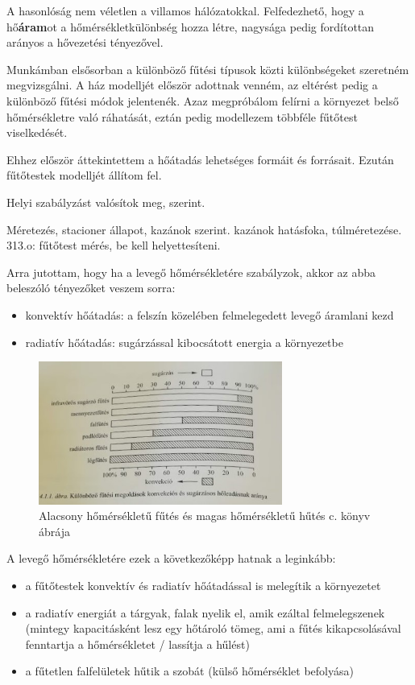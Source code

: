 A hasonlóság nem véletlen a villamos hálózatokkal. Felfedezhető, hogy a hő\textbf{áram}ot a hőmérsékletkülönbség hozza létre, nagysága pedig fordítottan arányos a hővezetési tényezővel. 


Munkámban elsősorban a különböző fűtési típusok közti különbségeket szeretném megvizsgálni. A ház modelljét először adottnak venném, az eltérést pedig a különböző fűtési módok jelentenék.
Azaz megpróbálom felírni a környezet belső hőmérsékletre való ráhatását, eztán pedig modellezem többféle fűtőtest viselkedését.

Ehhez először áttekintettem a hőátadás lehetséges formáit és forrásait.
Ezután fűtőtestek modelljét állítom fel.

Helyi szabályzást valósítok meg, \cite[118.~o.]{Herz} szerint.

Méretezés, stacioner állapot, kazánok \cite[235.~o.]{Herz} szerint. kazánok hatásfoka, túlméretezése. 313.o: fűtőtest mérés, be kell helyettesíteni.


\pagebreak

 Arra jutottam, hogy ha a levegő hőmérsékletére szabályzok, akkor az abba beleszóló tényezőket veszem sorra:
\begin{itemize}[noitemsep,topsep=0pt,parsep=0pt,partopsep=0pt]
	\item konvektív hőátadás: a felszín közelében felmelegedett levegő áramlani kezd
	\item radiatív hőátadás: sugárzással kibocsátott energia a környezetbe
\end{itemize}

\begin{figure}[h]
	\centering
	\includegraphics[width=8cm]{figures/konvrad}
	\caption{Alacsony hőmérsékletű fűtés és magas hőmérsékletű hűtés c. könyv ábrája}
\end{figure}


A levegő hőmérsékletére ezek a következőképp hatnak a leginkább:
\begin{itemize}[noitemsep,topsep=0pt,parsep=0pt,partopsep=0pt]
	\item a fűtőtestek konvektív és radiatív hőátadással is melegítik a környezetet
	\item a radiatív energiát a tárgyak, falak nyelik el, amik ezáltal felmelegszenek (mintegy kapacitásként lesz egy hőtároló tömeg, ami a fűtés kikapcsolásával fenntartja a hőmérsékletet / lassítja a hűlést)
	\item a fűtetlen falfelületek hűtik a szobát (külső hőmérséklet befolyása)
\end{itemize}

